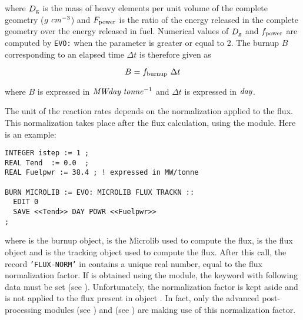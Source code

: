 \noindent where $D_{\rm g}$ is the mass of heavy elements per unit volume
of the complete geometry ($g\; {\it cm}^{-3}$) and $F_{\rm power}$ is the
ratio of the energy released in the complete geometry over the energy
released in fuel. Numerical values of $D_{\rm g}$ and $f_{\rm power}$ are
computed by {\tt EVO:} when the parameter  is greater or
equal to 2. The burnup $B$ corresponding to an elapsed time $\Delta t$ is
therefore given as

\begin{equation}
B=f_{\rm burnup} \ \Delta t
\label{eq:eq3}
\end{equation}

\noindent where $B$ is expressed in ${\it MWday}\;{\it tonne}^{-1}$ and $\Delta t$
is expressed in ${\it day}$.

\vskip 0.2cm

The unit of the reaction rates depends on the normalization applied to the flux. This normalization
takes place after the flux calculation, using the  module. Here is an example:

\begin{verbatim}
INTEGER istep := 1 ;
REAL Tend  := 0.0  ;
REAL Fuelpwr := 38.4 ; ! expressed in MW/tonne

BURN MICROLIB := EVO: MICROLIB FLUX TRACKN ::
  EDIT 0
  SAVE <<Tend>> DAY POWR <<Fuelpwr>>
;
\end{verbatim}

\noindent where  is the burnup object,  is the Microlib used to compute the flux,  is the flux
object and  is the tracking object used to compute the flux. After this call, the record
{\tt 'FLUX-NORM'} in  contains a unique real number, equal to the flux normalization factor. If  is
obtained using the  module, the  keyword with following data must be set (see ).
Unfortunately, the normalization factor is kept aside and is not applied to the flux present in object . In
fact, only the advanced post-processing modules  (see ) and  (see )
are making use of this normalization factor.

\eject
